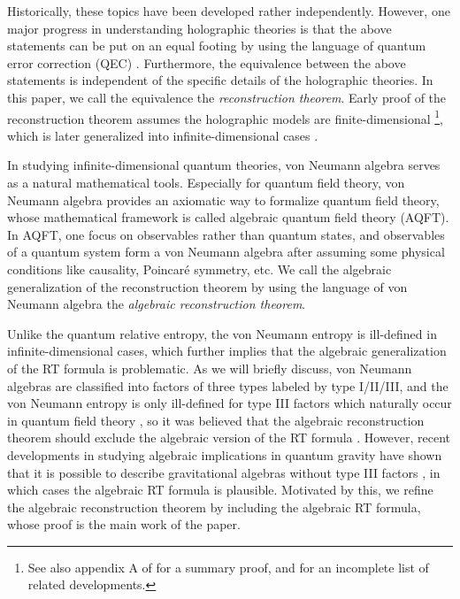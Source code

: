 \documentclass[a4paper,11pt]{article}
\renewcommand{\=}[1]{\stackrel{#1}{=}} %
\begin{document}
Historically, these topics have been developed rather independently. However, one major progress in understanding holographic theories is that the above statements can be put on an equal footing by using the language of quantum error correction (QEC) \cite{Grassl:1996eh}. Furthermore, the equivalence between the above statements is independent of the specific details of the holographic theories. In this paper, we call the equivalence the \emph{reconstruction theorem}. Early proof of the reconstruction theorem assumes the holographic models are finite-dimensional \cite{Almheiri_2015,Dong:2016eik,Harlow:2016vwg}\footnote{See also appendix A of \cite{Zhong:2024fmn} for a summary proof, and \cite{Faulkner:2020hzi,Akers:2021fut,Gesteau:2023hbq} for an incomplete list of related developments.}, which is later generalized into infinite-dimensional cases \cite{Kamal:2019skn,Kang:2018xqy}.


In studying infinite-dimensional quantum theories, von Neumann algebra serves as a natural mathematical tools. Especially for quantum field theory, von Neumann algebra provides an axiomatic way to formalize quantum field theory, whose mathematical framework is called algebraic quantum field theory (AQFT).  In
AQFT, one focus on observables rather than quantum states, and observables of a quantum system form a von Neumann algebra after assuming some physical conditions like causality, Poincar\'e symmetry, etc. We call the algebraic generalization of the reconstruction theorem by using the language of von Neumann algebra the \emph{algebraic reconstruction theorem}.

Unlike the quantum relative entropy, the von Neumann entropy is ill-defined in infinite-dimensional cases, which further implies that the algebraic generalization of the RT formula is problematic. As we will briefly discuss, von Neumann algebras are classified into factors of three types labeled by type I/II/III, and the von Neumann entropy is only ill-defined for type III factors which naturally occur in quantum field theory \cite{Yngvason:2004uh}, so it was believed that the algebraic reconstruction theorem should exclude the algebraic version of the RT formula \cite{Kang:2018xqy,Kang:2019dfi}. However, recent developments in studying algebraic implications in quantum gravity have shown that it is possible to describe gravitational algebras without type III factors \cite{Witten:2021unn,Chandrasekaran:2022cip,Jensen:2023yxy,Kudler-Flam:2023hkl,Colafranceschi:2023urj,Faulkner:2024gst,Kudler-Flam:2023qfl,Kudler-Flam:2024psh,AliAhmad:2023etg}, in which cases the algebraic RT formula is plausible. Motivated by this, we refine the algebraic reconstruction theorem by including the algebraic RT formula, whose proof is the main work of the paper.
\end{document}
